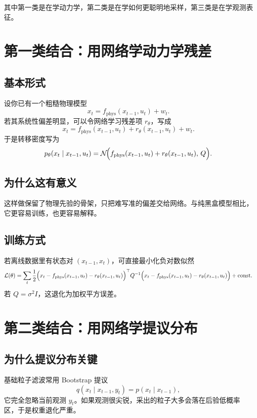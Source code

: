 \documentclass[12pt,a4paper]{ctexart}
\begin{document}
其中第一类是在学动力学，第二类是在学如何更聪明地采样，第三类是在学观测表征。

\section{第一类结合：用网络学动力学残差}

\subsection{基本形式}

设你已有一个粗糙物理模型
\[
x_t = f_{\mathrm{phys}}(x_{t-1},u_t) + w_t.
\]
若其系统性偏差明显，可以令网络学习残差项 \(r_\theta\)，写成
\[
x_t = f_{\mathrm{phys}}(x_{t-1},u_t) + r_\theta(x_{t-1},u_t) + w_t.
\]
于是转移密度写为
\[
p_\theta(x_t \mid x_{t-1},u_t)
= \mathcal{N}\!\Bigl(f_{\mathrm{phys}}(x_{t-1},u_t)+r_\theta(x_{t-1},u_t),\,Q\Bigr).
\]

\subsection{为什么这有意义}

这样做保留了物理先验的骨架，只把难写准的偏差交给网络。与纯黑盒模型相比，它更容易训练，也更容易解释。

\subsection{训练方式}

若离线数据里有状态对 \((x_{t-1},x_t)\)，可直接最小化负对数似然
\[
\mathcal{L}(\theta)
= \sum_t \frac{1}{2}
\Bigl(x_t - f_{\mathrm{phys}}(x_{t-1},u_t)-r_\theta(x_{t-1},u_t)\Bigr)^\top
Q^{-1}
\Bigl(x_t - f_{\mathrm{phys}}(x_{t-1},u_t)-r_\theta(x_{t-1},u_t)\Bigr)
+ \mathrm{const}.
\]
若 \(Q=\sigma^2 I\)，这退化为加权平方误差。

\section{第二类结合：用网络学提议分布}

\subsection{为什么提议分布关键}

基础粒子滤波常用 Bootstrap 提议
\[
q(x_t \mid x_{t-1}, y_t)=p(x_t \mid x_{t-1}),
\]
它完全忽略当前观测 \(y_t\)。如果观测很尖锐，采出的粒子大多会落在后验低概率区，于是权重退化严重。
\end{document}
